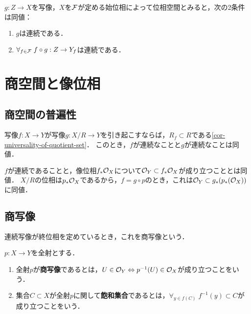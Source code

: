 \documentclass[uplatex,dvipdfmx]{jsreport}
\begin{document}
\begin{corollary}
    $g:Z\to X$を写像，$X$を$\mathcal{F}$が定める始位相によって位相空間とみると，次の2条件は同値：
    \begin{enumerate}
        \item $g$は連続である．
        \item $\forall_{f\in\mathcal{F}}\;f\circ g:Z\to Y_f$は連続である．
    \end{enumerate}
\end{corollary}

\section{商空間と像位相}

\subsection{商空間の普遍性}

\begin{proposition}
    写像$f:X\to Y$が写像$g:X/R\to Y$を引き起こすならば，$R_f\subset R$である\ref{cor-universality-of-quotient-set}．
    このとき，$f$が連続なことと$g$が連続なことは同値．
\end{proposition}
\begin{Proof}
    $f$が連続であることと，像位相$f_*\mathcal{O}_X$について$\mathcal{O}_Y\subset f_*\mathcal{O}_X$が成り立つこととは同値．
    $X/R$の位相は$p_*\mathcal{O}_X$であるから，$f=g\circ p$のとき，これは$\mathcal{O}_Y\subset g_*(p_*(\mathcal{O}_X))$に同値．
\end{Proof}

\subsection{商写像}

\begin{tcolorbox}[colframe=ForestGreen, colback=ForestGreen!10!white,breakable,colbacktitle=ForestGreen!40!white,coltitle=black,fonttitle=\bfseries\sffamily,
title=]
    連続写像が終位相を定めているとき，これを商写像という．
\end{tcolorbox}

\begin{definition}
    $p:X\to Y$を全射とする．
    \begin{enumerate}
        \item 全射$p$が\textbf{商写像}であるとは，$U\in\mathcal{O}_Y\Leftrightarrow p^{-1}(U)\in\mathcal{O}_X$が成り立つことをいう．
        \item 集合$C\subset X$が全射$p$に関して\textbf{飽和集合}であるとは，$\forall_{y\in f(C)}\;f^{-1}(y)\subset C$が成り立つことをいう．
    \end{enumerate}
\end{definition}
\end{document}

